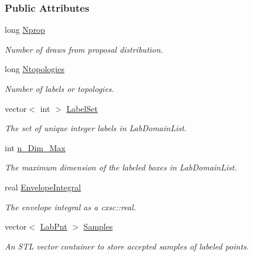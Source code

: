 \subsubsection*{\-Public \-Attributes}
\begin{DoxyCompactItemize}
\item 
long \hyperlink{classRSSample_ada252846a5f08bfad0ceb6debd2054b8}{\-Nprop}
\begin{DoxyCompactList}\small\item\em \-Number of draws from proposal distribution. \end{DoxyCompactList}\item 
long \hyperlink{classRSSample_aaef16832fe9e088f8d99019ae024ecd4}{\-Ntopologies}
\begin{DoxyCompactList}\small\item\em \-Number of labels or topologies. \end{DoxyCompactList}\item 
vector$<$ int $>$ \hyperlink{classRSSample_a1a4bb7b0764f4d82e6db5eb24ce86d34}{\-Label\-Set}
\begin{DoxyCompactList}\small\item\em \-The set of unique integer labels in \-Lab\-Domain\-List. \end{DoxyCompactList}\item 
int \hyperlink{classRSSample_a7aff363040b93e76f56f58db43b68894}{n\-\_\-\-Dim\-\_\-\-Max}
\begin{DoxyCompactList}\small\item\em \-The maximum dimension of the labeled boxes in \-Lab\-Domain\-List. \end{DoxyCompactList}\item 
real \hyperlink{classRSSample_aa3f52ce941256fc7d6cf71347fdfa67c}{\-Envelope\-Integral}
\begin{DoxyCompactList}\small\item\em \-The envelope integral as a cxsc\-::real. \end{DoxyCompactList}\item 
vector$<$ \hyperlink{classLabPnt}{\-Lab\-Pnt} $>$ \hyperlink{classRSSample_a16622505cb282b5ebe608479fc026c12}{\-Samples}
\begin{DoxyCompactList}\small\item\em \-An \-S\-T\-L vector container to store accepted samples of labeled points. \end{DoxyCompactList}\end{DoxyCompactItemize}


